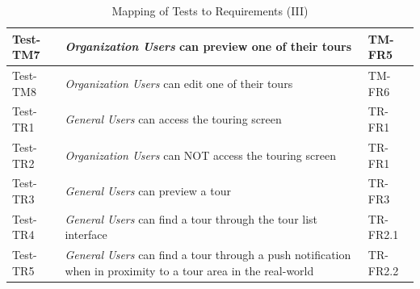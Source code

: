 \documentclass[12pt, titlepage]{article}
\begin{document}
\begin{table}[htpb!]
\begin{tabular}{|l|p{8cm}|p{3cm}|}
    \hline
    Test-TM7         & \textit{Organization Users} can preview one of their tours                                                            & TM-FR5                \\
    \hline
    Test-TM8         & \textit{Organization Users} can edit one of their tours                                                               & TM-FR6                \\
    \hline
    Test-TR1         & \textit{General Users} can access the touring screen                                                                  & TR-FR1                \\
    \hline
    Test-TR2         & \textit{Organization Users} can NOT access the touring screen                                                         & TR-FR1                \\
    \hline
    Test-TR3         & \textit{General Users} can preview a tour                                                                             & TR-FR3                \\
    \hline
    Test-TR4         & \textit{General Users} can find a tour through the tour list interface                                                & TR-FR2.1              \\
    \hline
    Test-TR5         & \textit{General Users} can find a tour through a push notification when in proximity to a tour area in the real-world & TR-FR2.2              \\
    \hline
  \end{tabular}
  \caption{Mapping of Tests to Requirements (III)}
  \label{tab:test_requirements3}
\end{table}
\end{document}
